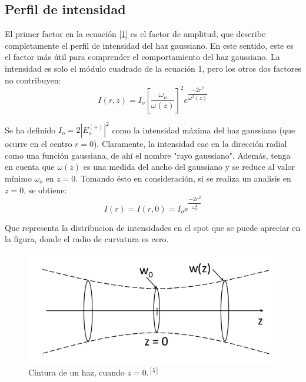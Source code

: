 \documentclass[11pt,letterpaper,twocolumn]{article}
\begin{document}
\subsection*{Perfil de intensidad}
El primer factor en la ecuación \ref{1} es el factor de amplitud, que describe completamente el perfil de intensidad del haz gaussiano. En este sentido, este es el factor más útil para comprender el comportamiento del haz gaussiano. La intensidad es solo el módulo cuadrado de la ecuación 1, pero los otros dos factores no contribuyen:
\begin{equation}
I(r,z)=I_{o}[\dfrac{\omega_{o}}{\omega (z)}]^{2} e^{\dfrac{-2r^{2}}{\omega^{2}(z)}}
\end{equation}
\par 
Se ha definido $I_{o}= 2|E_{o}^{(+)}|^{2}$ como la intensidad máxima del haz gaussiano (que ocurre en el centro $r=0$). Claramente, la intensidad cae en la dirección radial como una función gaussiana, de ahí el nombre "rayo gaussiano". Además, tenga en cuenta que $\omega(z)$ es una medida del ancho del gaussiano y se reduce al valor mínimo $\omega_{o}$ en $z=0$. Tomando ésto en consideración, si se realiza un analisis en $z=0$, se obtiene: 
\begin{equation}
I(r)=I(r,0)=I_{o} e^{\dfrac{-2r^{2}}{\omega_{o}^{2}}}
\label{inten}
\end{equation}
\par 
Que representa la distribucion de intensidades en el spot que se puede apreciar en la figura, donde el radio de curvatura es cero.
\begin{figure}[h!]
\begin{center}
\includegraphics[scale=0.4]{spot.png}
\caption{Cintura de un haz, cuando $z=0$.$^{[5]}$}
\end{center}
\end{figure}
\end{document}
